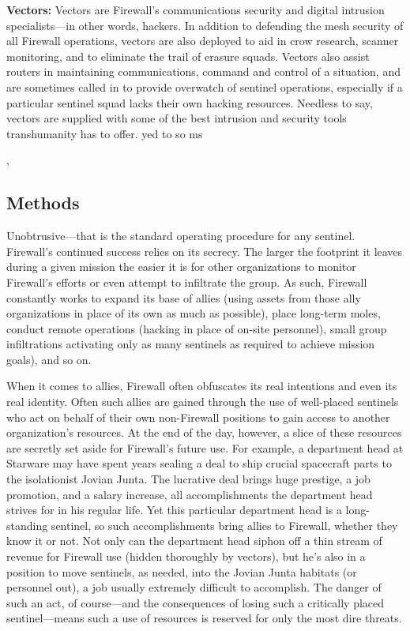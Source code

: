\textbf{Vectors:} Vectors are Firewall's communications security
and digital intrusion specialists—in other words,
hackers. In addition to defending the mesh security 
of all Firewall operations, vectors are also deployed 
to aid in crow research, scanner monitoring, and to 
eliminate the trail of erasure squads. Vectors also 
assist routers in maintaining communications, command
and control of a situation, and are sometimes
called in to provide overwatch of sentinel operations, 
especially if a particular sentinel squad lacks their 
own hacking resources. Needless to say, vectors are 
supplied with some of the best intrusion and security 
tools transhumanity has to offer.
yed 
to 
so 
ms


,

\subsection{Methods }

Unobtrusive—that is the standard operating procedure
for any sentinel. Firewall's continued success
relies on its secrecy. The larger the footprint
it leaves during a given mission the easier it is for 
other organizations to monitor Firewall's efforts or 
even attempt to infiltrate the group. As such, Firewall
constantly works to expand its base of allies
(using assets from those ally organizations in place 
of its own as much as possible), place long-term 
moles, conduct remote operations (hacking in place 
of on-site personnel), small group infiltrations activating
only as many sentinels as required to achieve
mission goals), and so on. 

When it comes to allies, Firewall often obfuscates 
its real intentions and even its real identity. Often 
such allies are gained through the use of well-placed 
sentinels who act on behalf of their own non-Firewall
positions to gain access to another organization's
resources. At the end of the day, however,
a slice of these resources are secretly set aside for 
Firewall's future use. For example, a department 
head at Starware may have spent years sealing a 
deal to ship crucial spacecraft parts to the isolationist
Jovian Junta. The lucrative deal brings huge
prestige, a job promotion, and a salary increase, all 
accomplishments the department head strives for in 
his regular life. Yet this particular department head 
is a long-standing sentinel, so such accomplishments
bring allies to Firewall, whether they know
it or not. Not only can the department head siphon 
off a thin stream of revenue for Firewall use (hidden 
thoroughly by vectors), but he's also in a position 
to move sentinels, as needed, into the Jovian Junta 
habitats (or personnel out), a job usually extremely 
difficult to accomplish. The danger of such an act, 
of course—and the consequences of losing such a 
critically placed sentinel—means such a use of resources
is reserved for only the most dire threats.

